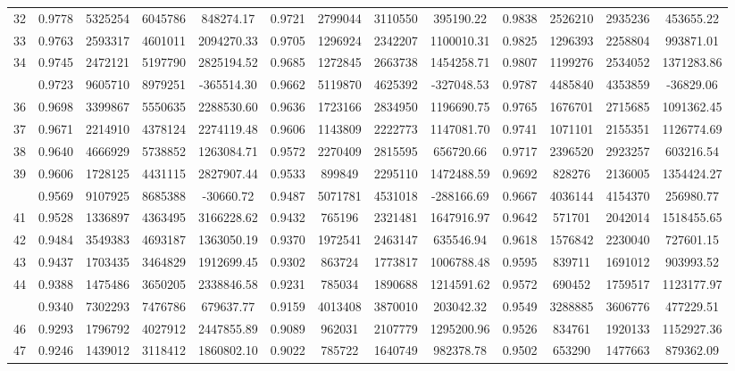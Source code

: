 \documentclass[
  12pt,
]{article}
\begin{document}
\begin{longtable}[t]{lcccccccccccc}
32 & 0.9778 & 5325254 & 6045786 & 848274.17 & 0.9721 & 2799044 & 3110550 & 395190.22 & 0.9838 & 2526210 & 2935236 & 453655.22\\
33 & 0.9763 & 2593317 & 4601011 & 2094270.33 & 0.9705 & 1296924 & 2342207 & 1100010.31 & 0.9825 & 1296393 & 2258804 & 993871.01\\
34 & 0.9745 & 2472121 & 5197790 & 2825194.52 & 0.9685 & 1272845 & 2663738 & 1454258.71 & 0.9807 & 1199276 & 2534052 & 1371283.86\\
\addlinespace
35 & 0.9723 & 9605710 & 8979251 & -365514.30 & 0.9662 & 5119870 & 4625392 & -327048.53 & 0.9787 & 4485840 & 4353859 & -36829.06\\
36 & 0.9698 & 3399867 & 5550635 & 2288530.60 & 0.9636 & 1723166 & 2834950 & 1196690.75 & 0.9765 & 1676701 & 2715685 & 1091362.45\\
37 & 0.9671 & 2214910 & 4378124 & 2274119.48 & 0.9606 & 1143809 & 2222773 & 1147081.70 & 0.9741 & 1071101 & 2155351 & 1126774.69\\
38 & 0.9640 & 4666929 & 5738852 & 1263084.71 & 0.9572 & 2270409 & 2815595 & 656720.66 & 0.9717 & 2396520 & 2923257 & 603216.54\\
39 & 0.9606 & 1728125 & 4431115 & 2827907.44 & 0.9533 & 899849 & 2295110 & 1472488.59 & 0.9692 & 828276 & 2136005 & 1354424.27\\
\addlinespace
40 & 0.9569 & 9107925 & 8685388 & -30660.72 & 0.9487 & 5071781 & 4531018 & -288166.69 & 0.9667 & 4036144 & 4154370 & 256980.77\\
41 & 0.9528 & 1336897 & 4363495 & 3166228.62 & 0.9432 & 765196 & 2321481 & 1647916.97 & 0.9642 & 571701 & 2042014 & 1518455.65\\
42 & 0.9484 & 3549383 & 4693187 & 1363050.19 & 0.9370 & 1972541 & 2463147 & 635546.94 & 0.9618 & 1576842 & 2230040 & 727601.15\\
43 & 0.9437 & 1703435 & 3464829 & 1912699.45 & 0.9302 & 863724 & 1773817 & 1006788.48 & 0.9595 & 839711 & 1691012 & 903993.52\\
44 & 0.9388 & 1475486 & 3650205 & 2338846.58 & 0.9231 & 785034 & 1890688 & 1214591.62 & 0.9572 & 690452 & 1759517 & 1123177.97\\
\addlinespace
45 & 0.9340 & 7302293 & 7476786 & 679637.77 & 0.9159 & 4013408 & 3870010 & 203042.32 & 0.9549 & 3288885 & 3606776 & 477229.51\\
46 & 0.9293 & 1796792 & 4027912 & 2447855.89 & 0.9089 & 962031 & 2107779 & 1295200.96 & 0.9526 & 834761 & 1920133 & 1152927.36\\
47 & 0.9246 & 1439012 & 3118412 & 1860802.10 & 0.9022 & 785722 & 1640749 & 982378.78 & 0.9502 & 653290 & 1477663 & 879362.09\\

\end{longtable}
\end{document}
